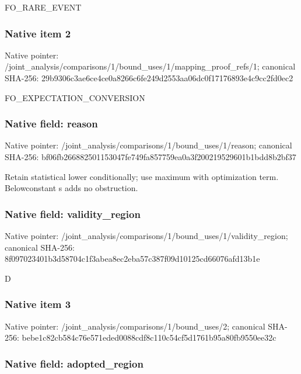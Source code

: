 \documentclass[10pt,a4paper]{article}
\begin{document}
FO\_RARE\_EVENT


\subsubsection{Native item 2}


Native pointer: /joint\_analysis/comparis\allowbreak{}ons/1/bound\_uses/1/mappi\allowbreak{}ng\_proof\_refs/1; canonical SHA-256: 29b9306c3ae6ce4ce0a8266c\allowbreak{}6fe249d2553aa06dc0f17176\allowbreak{}893e4c9cc2fd0ec2


FO\_EXPECTATION\_CONVERSION


\subsubsection{Native field: reason}


Native pointer: /joint\_analysis/comparis\allowbreak{}ons/1/bound\_uses/1/reaso\allowbreak{}n; canonical SHA-256: bf06fb266882501153047fe7\allowbreak{}49fa857759ea0a3f20021952\allowbreak{}9601b1bdd8b2bf37


Retain statistical lower conditionally; use maximum with optimization term. Belowconstant s adds no obstruction.


\subsubsection{Native field: validity\_region}


Native pointer: /joint\_analysis/comparis\allowbreak{}ons/1/bound\_uses/1/valid\allowbreak{}ity\_region; canonical SHA-256: 8f097023401b3d58704c1f3a\allowbreak{}bea8ec2eba57c387f09d1012\allowbreak{}5cd66076afd13b1e


D


\subsubsection{Native item 3}


Native pointer: /joint\_analysis/comparis\allowbreak{}ons/1/bound\_uses/2; canonical SHA-256: bebe1c82cb584c76e571eded\allowbreak{}0088cdf8c110c54cf5d1761b\allowbreak{}95a80fb9550ee32c



\subsubsection{Native field: adopted\_region}
\end{document}
